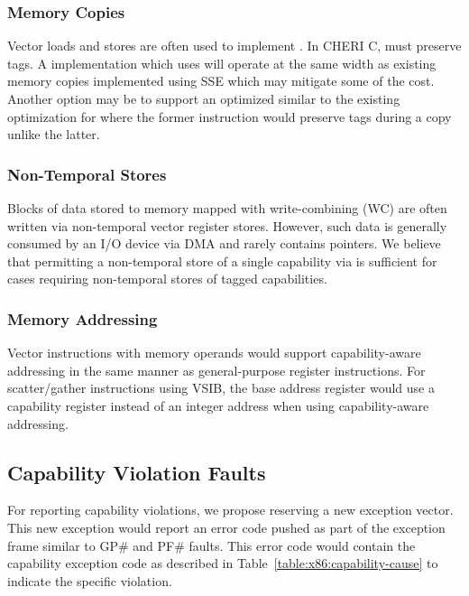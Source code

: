 \subsubsection{Memory Copies}

Vector loads and stores are often used to implement .
In CHERI C,  must preserve tags.  A 
implementation which uses  will operate at the same
width as existing memory copies implemented using SSE which may
mitigate some of the cost.  Another option may be to support an
optimized  similar to the existing optimization
for  where the former instruction would preserve
tags during a copy unlike the latter.

\subsubsection{Non-Temporal Stores}

Blocks of data stored to memory mapped with write-combining (WC) are
often written via non-temporal vector register stores.  However, such
data is generally consumed by an I/O device via DMA and rarely
contains pointers.  We believe that permitting a non-temporal store of
a single capability via  is sufficient for cases
requiring non-temporal stores of tagged capabilities.

\subsubsection{Memory Addressing}

Vector instructions with memory operands would support
capability-aware addressing in the same manner as general-purpose
register instructions.  For scatter/gather instructions using VSIB,
the base address register would use a capability register instead of
an integer address when using capability-aware addressing.

\subsection{Capability Violation Faults}
\label{sec:x86:capability-fault}

For reporting capability violations, we propose reserving a new
exception vector.  This new exception would report an error code
pushed as part of the exception frame similar to GP\# and PF\# faults.
This error code would contain the capability exception code as
described in Table~\ref{table:x86:capability-cause} to indicate
the specific violation.

